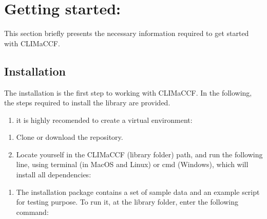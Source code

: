 \documentclass[a4paper,11pt,english]{sphinxmanual}
\begin{document}
\chapter{Getting started:}
\label{\detokenize{index:getting-started}}
\sphinxAtStartPar
This section briefly presents the necessary information required to get started with CLIMaCCF.

\sphinxstepscope


\section{Installation}
\label{\detokenize{gStarted:installation}}\label{\detokenize{gStarted::doc}}
\sphinxAtStartPar
The installation is the first step to working with CLIMaCCF. In the following, the steps required to install the library are provided.
\begin{enumerate}
%
\setcounter{enumi}{-1}
\item {} 
\sphinxAtStartPar
it is highly recomended to create a virtual environment:

\end{enumerate}

\begin{sphinxVerbatim}[commandchars=\\\{\}]
   
  
\end{sphinxVerbatim}
\begin{enumerate}
%
\item {} 
\sphinxAtStartPar
Clone or download the repository.

\item {} 
\sphinxAtStartPar
Locate yourself in the CLIMaCCF (library folder) path, and run the following line, using terminal (in MacOS and Linux) or cmd (Windows), which will install all dependencies:

\end{enumerate}

\begin{sphinxVerbatim}[commandchars=\\\{\}]
  
\end{sphinxVerbatim}
\begin{enumerate}
%
\setcounter{enumi}{2}
\item {} 
\sphinxAtStartPar
The installation package contains a set of sample data and an example script for testing purpose. To run it, at the library folder, enter the following command:

\end{enumerate}
\end{document}
